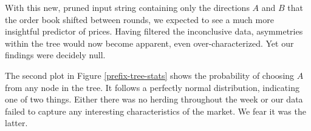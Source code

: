 With this new, pruned input string containing only the directions $A$ and $B$ that the order book shifted between rounds, we expected to see a much more insightful predictor of prices.
Having filtered the inconclusive data, asymmetries within the tree would now become apparent, even over-characterized.
Yet our findings were decidely null.



The second plot in Figure \ref{prefix-tree-stats} shows the probability of choosing $A$ from any node in the tree.
It follows a perfectly normal distribution, indicating one of two things.
Either there was no herding throughout the week or our data failed to capture any interesting characteristics of the market.
We fear it was the latter.




